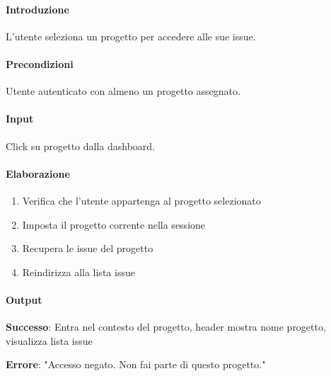 \begin{reqbox}[title=REQ-FUN-03: Seleziona Progetto]
\label{subsubsec:req-seleziona-progetto}

\paragraph{Introduzione}
L'utente seleziona un progetto per accedere alle sue issue.

\paragraph{Precondizioni}
Utente autenticato con almeno un progetto assegnato.

\paragraph{Input}
Click su progetto dalla dashboard.

\paragraph{Elaborazione}
\begin{enumerate}[leftmargin=1.1em]
\item Verifica che l'utente appartenga al progetto selezionato
\item Imposta il progetto corrente nella sessione
\item Recupera le issue del progetto
\item Reindirizza alla lista issue
\end{enumerate}

\paragraph{Output}
\textbf{Successo}: Entra nel contesto del progetto, header mostra nome progetto, visualizza lista issue

\textbf{Errore}: "Accesso negato. Non fai parte di questo progetto."

\end{reqbox}

\vspace{0.5cm}

\newpage


